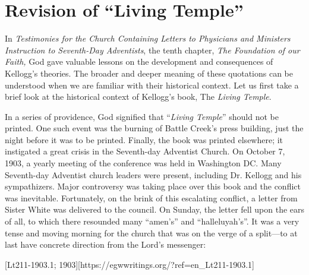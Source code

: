 \chapter{Revision of “Living Temple”}

In \textit{Testimonies for the Church Containing Letters to Physicians and Ministers Instruction to Seventh-Day Adventists}, the tenth chapter, \textit{The Foundation of our Faith,} God gave valuable lessons on the development and consequences of Kellogg's theories. The broader and deeper meaning of these quotations can be understood when we are familiar with their historical context. Let us first take a brief look at the historical context of Kellogg's book, The \textit{Living Temple}.

In a series of providence, God signified that “\textit{Living Temple}” should not be printed. One such event was the burning of Battle Creek's press building, just the night before it was to be printed. Finally, the book was printed elsewhere; it instigated a great crisis in the Seventh-day Adventist Church. On October 7, 1903, a yearly meeting of the conference was held in Washington DC. Many Seventh-day Adventist church leaders were present, including Dr. Kellogg and his sympathizers. Major controversy was taking place over this book and the conflict was inevitable. Fortunately, on the brink of this escalating conflict, a letter from Sister White was delivered to the council. On Sunday, the letter fell upon the ears of all, to which there resounded many “amen's” and “halleluyah's”. It was a very tense and moving morning for the church that was on the verge of a split—to at last have concrete direction from the Lord's messenger:

[Lt211-1903.1; 1903][https://egwwritings.org/?ref=en\_Lt211-1903.1]

